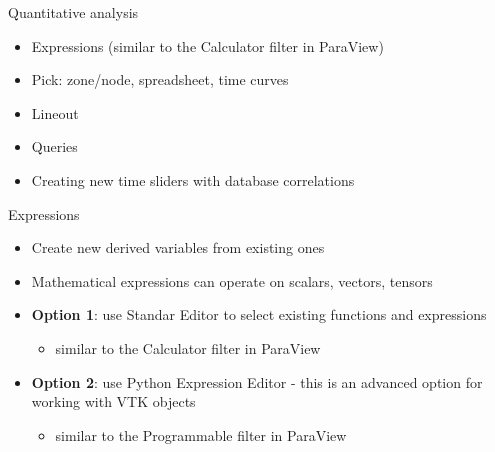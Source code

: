 \begin{comment}
  http://www.vtk.org/download - Download VTK textbook examples and data - PineRoot.tgz
  http://www.vtk.org/files/release/7.0/VTKLargeData-7.0.0.zip
  http://www.visitusers.org/index.php?title=Short_Tutorial
\end{comment}

\begin{frame}{Quantitative analysis}{}
  \begin{itemize}\setlength{\itemsep}{3mm}
  \item Expressions (similar to the Calculator filter in ParaView)
  \item Pick: zone/node, spreadsheet, time curves
  \item Lineout
  \item Queries
  \item Creating new time sliders with database correlations
  \end{itemize}
\end{frame}

\begin{frame}{Expressions}
  \begin{itemize}\setlength{\itemsep}{5mm}
  \item Create new derived variables from existing ones
  \item Mathematical expressions can operate on scalars, vectors, tensors
  \item {\bf Option 1}: use Standar Editor to select existing functions and expressions
    \begin{itemize}
    \item similar to the Calculator filter in ParaView
    \end{itemize}
  \item {\bf Option 2}: use Python Expression Editor - this is an advanced option for working with VTK objects
    \begin{itemize}
    \item similar to the Programmable filter in ParaView
    \end{itemize}
  \end{itemize}
\end{frame}

